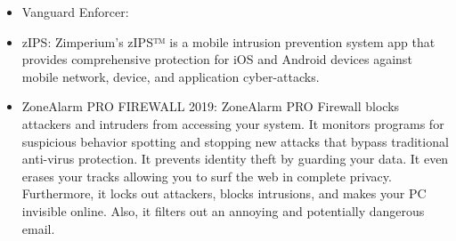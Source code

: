 \begin{itemize}
    \item Vanguard Enforcer:
    \item zIPS: Zimperium's zIPS™ is a mobile intrusion prevention system app that provides comprehensive protection for iOS and Android devices against mobile network, device, and application cyber-attacks.
    \item ZoneAlarm PRO FIREWALL 2019: ZoneAlarm PRO Firewall blocks attackers and intruders from accessing your system. It monitors programs for suspicious behavior spotting and stopping new attacks that bypass traditional anti-virus protection. It prevents identity theft by guarding your data. It even erases your tracks allowing you to surf the web in complete privacy. Furthermore, it locks out attackers, blocks intrusions, and makes your PC invisible online. Also, it filters out an annoying and potentially dangerous email.
\end{itemize}
